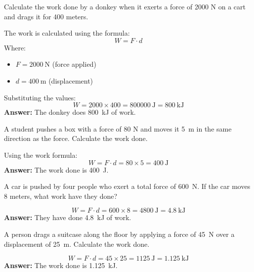 \begin{exercise}
    Calculate the work done by a donkey when it exerts a force of 2000 N on a cart and drags it for 400 meters.
    \begin{solu}
        The work is calculated using the formula:
        \[
            W = F \cdot d
        \]
        Where:
        \begin{itemize}
            \item $F = \qty{2000}{\newton}$ (force applied)
            \item $d = \qty{400}{\metre}$ (displacement)
        \end{itemize}
        Substituting the values:
        \[
            W = 2000 \times 400 = \qty{800000}{\joule} = \qty{800}{\kilo\joule}
        \]
        \textbf{Answer:} The donkey does \qty{800}{\kilo\joule} of work.
    \end{solu}
\end{exercise}

\begin{exercise}
    A student pushes a box with a force of 80 N and moves it \qty{5}{\metre} in the same direction as the force. Calculate the work done.
    \begin{solu}
        Using the work formula:
        \[
            W = F \cdot d = 80 \times 5 = \qty{400}{\joule}
        \]
        \textbf{Answer:} The work done is \qty{400}{\joule}.
    \end{solu}
\end{exercise}

\begin{exercise}
    A car is pushed by four people who exert a total force of \qty{600}{\newton}. If the car moves 8 meters, what work have they done?
    \begin{solu}

        \[
            W = F \cdot d = 600 \times 8 = \qty{4800}{\joule} = \qty{4.8}{\kilo\joule}
        \]
        \textbf{Answer:} They have done \qty{4.8}{\kilo\joule} of work.
    \end{solu}
\end{exercise}

\begin{exercise}
    A person drags a suitcase along the floor by applying a force of \qty{45}{\newton} over a displacement of \qty{25}{\metre}. Calculate the work done.
    \begin{solu}
        \[
            W = F \cdot d = 45 \times 25 = \qty{1125}{\joule} = \qty{1.125}{\kilo\joule}
        \]
        \textbf{Answer:} The work done is \qty{1.125}{\kilo\joule}.
    \end{solu}
\end{exercise}

